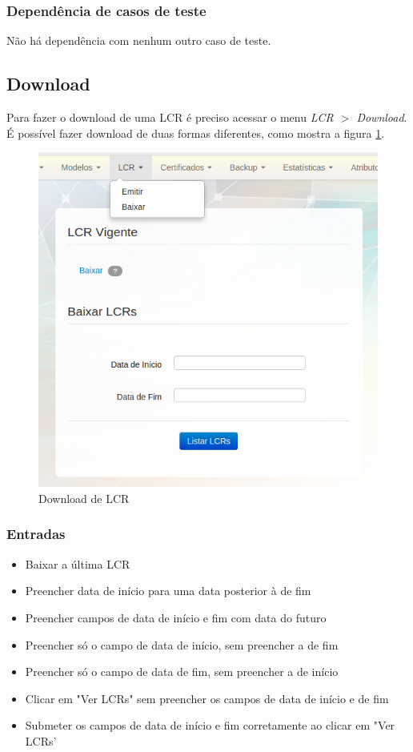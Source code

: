 \subsubsection{Dependência de casos de teste}
Não há dependência com nenhum outro caso de teste.

\subsection{Download}

Para fazer o download de uma LCR é preciso acessar o menu \textit{LCR $>$ Download}. É possível fazer download de duas formas diferentes, como mostra a figura \ref{fig:lcr}. 

\begin{figure}[ht]
     \centering
     \includegraphics[scale=0.6]{images/saec21lcrdown.png}
     \caption{Download de LCR}
     \label{fig:lcr}
\end{figure}

\subsubsection{Entradas}
\begin{itemize}

	\item Baixar a última LCR
	\item Preencher data de início para uma data posterior à de fim
	\item Preencher campos de data de início e fim com data do futuro
	\item Preencher só o campo de data de início, sem preencher a de fim
	\item Preencher só o campo de data de fim, sem preencher a de início
	\item Clicar em "Ver LCRs" sem preencher os campos de data de início e de fim
	\item Submeter os campos de data de início e fim corretamente ao clicar em "Ver LCRs'
	
\end{itemize}

